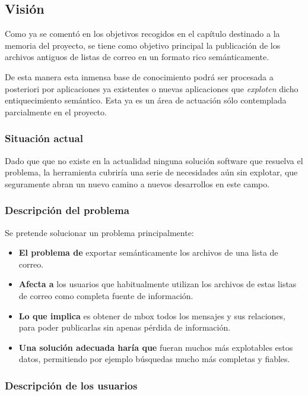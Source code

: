 
\subsection{Visión}

Como ya se comentó en los objetivos recogidos en el capítulo destinado a
la memoria del proyecto, se tiene como objetivo principal la publicación 
de los archivos antiguos de listas de correo en un formato rico 
semánticamente.

De esta manera esta inmensa base de conocimiento podrá ser procesada a 
posteriori por aplicaciones ya existentes o nuevas aplicaciones que 
\emph{exploten} dicho entiquecimiento semántico. Esta ya es un área de 
actuación sólo contemplada parcialmente en el proyecto.

\subsubsection{Situación actual}

Dado que que no existe en la actualidad ninguna solución software que
resuelva el problema, la herramienta cubriría una serie de necesidades
aún sin explotar, que seguramente abran un nuevo camino a nuevos 
desarrollos en este campo.

\subsubsection{Descripción del problema}

Se pretende solucionar un problema principalmente:

\begin{itemize}
  \item \textbf{El problema de} exportar semánticamente los archivos 
	de una lista de correo.
  \item \textbf{Afecta a} los usuarios que habitualmente utilizan los 
	archivos de estas listas de correo como completa fuente de 
	información.
  \item \textbf{Lo que implica} es obtener de mbox todos los mensajes 
	y sus relaciones, para poder publicarlas sin apenas pérdida de
	información.
  \item \textbf{Una solución adecuada haría que} fueran muchos más
	explotables estos datos, permitiendo por ejemplo búsquedas
	mucho más completas y fiables.
\end{itemize}

\subsubsection{Descripción de los usuarios}

